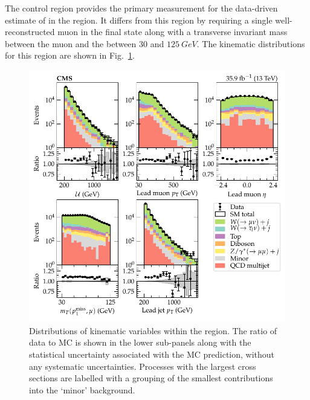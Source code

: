 The \muplusjets control region provides the primary measurement for the data-driven estimate of \IWlv in the \metplusjets region. It differs from this region by requiring a single well-reconstructed muon in the final state along with a transverse invariant mass between the muon and the \ptmiss between $30$ and $\SI{125}{GeV}$. The kinematic distributions for this region are shown in Fig.~\ref{fig:muplusjets}.
%
\begin{figure}[htb]
    \centering
    \includegraphics{chapters/042_backgrounds/images/singlemuon_dists.pdf}
    \caption[Single muon final state kinematics.]{
        Distributions of kinematic variables within the \muplusjets region. The ratio of data to MC is shown in the lower sub-panels along with the statistical uncertainty associated with the MC prediction, without any systematic uncertainties. Processes with the largest cross sections are labelled with a grouping of the smallest contributions into the `minor' background.
    }
    \label{fig:muplusjets}
\end{figure}
%
